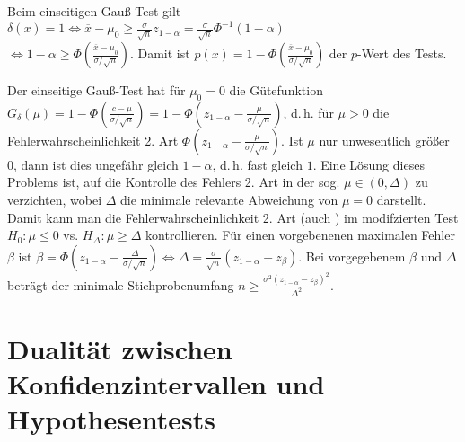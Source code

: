 \begin{Bsp}
    Beim einseitigen Gauß-Test gilt
    $\delta(x) = 1 \iff \overline{x} - \mu_0 \ge \frac{\sigma}{\sqrt{n}} z_{1-\alpha}
    = \frac{\sigma}{\sqrt{n}} \Phi^{-1}(1-\alpha)$\\
    $\iff 1 - \alpha \ge \Phi\!\left(\frac{\overline{x} - \mu_0}{\sigma/\sqrt{n}}\right)$.
    Damit ist $p(x) = 1 - \Phi\!\left(\frac{\overline{x} - \mu_0}{\sigma/\sqrt{n}}\right)$
    der $p$-Wert des Tests.
\end{Bsp}

\linie

\begin{Bsp}
    Der einseitige Gauß-Test hat für $\mu_0 = 0$ die Gütefunktion\\
    $G_\delta(\mu)
    = 1 - \Phi\!\left(\frac{c - \mu}{\sigma/\sqrt{n}}\right)
    = 1 - \Phi\!\left(z_{1-\alpha} - \frac{\mu}{\sigma/\sqrt{n}}\right)$,
    d.\,h. für $\mu > 0$ die Fehlerwahrscheinlichkeit 2. Art
    $\Phi\!\left(z_{1-\alpha} - \frac{\mu}{\sigma/\sqrt{n}}\right)$.
    Ist $\mu$ nur unwesentlich größer $0$, dann ist dies ungefähr gleich
    $1 - \alpha$, d.\,h. fast gleich $1$.
    Eine Lösung dieses Problems ist, auf die Kontrolle des Fehlers 2. Art in der sog.
     $\mu \in (0, \Delta)$ zu verzichten,
    wobei $\Delta$ die minimale relevante Abweichung von $\mu = 0$ darstellt.
    Damit kann man die Fehlerwahrscheinlichkeit 2. Art (auch )
    im modifzierten Test
    $H_0\colon \mu \le 0$ vs. $H_\Delta\colon \mu \ge \Delta$ kontrollieren.
    Für einen vorgebenenen maximalen Fehler $\beta$ ist
    $\beta = \Phi\!\left(z_{1-\alpha} - \frac{\Delta}{\sigma/\sqrt{n}}\right)
    \iff \Delta = \frac{\sigma}{\sqrt{n}} (z_{1-\alpha} - z_\beta)$.
    Bei vorgegebenem $\beta$ und $\Delta$ beträgt der minimale Stichprobenumfang
    $n \ge \frac{\sigma^2(z_{1-\alpha} - z_\beta)^2}{\Delta^2}$.
\end{Bsp}

\section{%
    Dualität zwischen Konfidenzintervallen und Hypothesentests%
}

